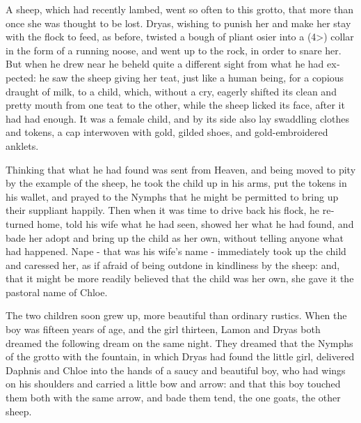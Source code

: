 \documentclass{book}
\begin{document}
\begin{pairs}
\begin{Rightside}
\begin{english}
  A sheep, which had recently lambed, went so often to this grotto, that more than once she was thought to be lost.  Dryas, wishing to punish her and make her stay with the flock to feed, as before, twisted a bough of pliant osier into a (4>) collar in the form of a running noose, and went up to the rock, in order to snare her.  But when he drew near he beheld quite a different sight from what he had expected: he saw the sheep giving her teat, just like a human being, for a copious draught of milk, to a child, which, without a cry, eagerly shifted its clean and pretty mouth from one teat to the other, while the sheep licked its face, after it had had enough.  It was a female child, and by its side also lay swaddling clothes and tokens, a cap interwoven with gold, gilded shoes, and gold-embroidered anklets.
\pend


  Thinking that what he had found was sent from Heaven, and being moved to pity by the example of the sheep, he took the child up in his arms, put the tokens in his wallet, and prayed to the Nymphs that he might be permitted to bring up their suppliant happily.  Then when it was time to drive back his flock, he returned home, told his wife what he had seen, showed her what he had found, and bade her adopt and bring up the child as her own, without telling anyone what had happened.  Nape - that was his wife's name - immediately took up the child and caressed her, as if afraid of being outdone in kindliness by the sheep: and, that it might be more readily believed that the child was her own, she gave it the pastoral name of Chloe.
\pend


  The two children soon grew up, more beautiful than ordinary rustics.  When the boy was fifteen years of age, and the girl thirteen, Lamon and Dryas both dreamed the following dream on the same night.  They dreamed that the Nymphs of the grotto with the fountain, in which Dryas had found the little girl, delivered Daphnis and Chloe into the hands of a saucy and beautiful boy, who had wings on his shoulders and carried a little bow and arrow: and that this boy touched them both with the same arrow, and bade them tend, the one goats, the other sheep.
\pend



\end{english}
\end{Rightside}
\end{pairs}
\end{document}
